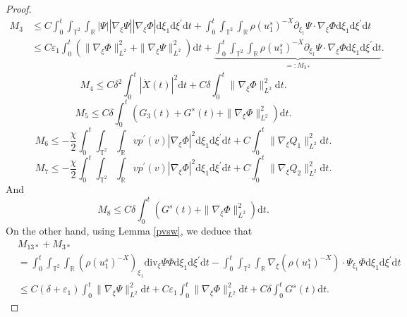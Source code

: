 \documentclass[10pt,reqno]{amsart}
\numberwithin{equation}{section}
\newcommand{\dif}{\mathrm{d}}
\newcommand{\ddiv}{\mathrm{div}}
\begin{document}
\begin{proof}
\begin{equation}
\begin{aligned}
M_3&\le C\int_0^t\int_{\mathbb{T}^2}\int_{\mathbb{R}}
        |\Psi||\nabla_\xi\Psi|
|\nabla_\xi\Phi|\dif \xi_1\dif \xi^{\prime}\dif t
+\int_0^t\int_{\mathbb{T}^2}\int_{\mathbb{R}}
        \rho (u_1^s)^{-X}\partial_{\xi_1}\Psi
\cdot\nabla_\xi\Phi\dif \xi_1\dif \xi^{\prime}\dif t\\
&\le C\varepsilon_1\int_0^t\left(\|\nabla_\xi\Phi\|_{L^2}^2+\|\nabla_\xi\Psi\|_{L^2}^2\right)\dif t
+\underbrace{\int_0^t\int_{\mathbb{T}^2}\int_{\mathbb{R}}
        \rho (u_1^s)^{-X}\partial_{\xi_1}\Psi
\cdot\nabla_\xi\Phi\dif \xi_1\dif \xi^{\prime}\dif t}\limits_{=:M_{3\ast}}.
\end{aligned}
\end{equation}
\begin{equation}\label{m4}
M_4 \le C\delta^2\int_0^t|\dot X(t)|^2\dif t+C\delta\int_0^t\|\nabla_\xi\Phi\|_{L^2}^2\dif t.
\end{equation}
\begin{equation}\label{m5}
M_5 \le C\delta\int_0^t\left(G_3(t)+G^s(t)+\|\nabla_\xi\Phi\|_{L^2}^2\right)\dif t.
\end{equation}
\begin{equation}\label{m6}
M_6 \le -\frac{\chi}{2}\int_0^t\int_{\mathbb{T}^2}\int_{\mathbb{R}}vp^\prime(v)|\nabla_\xi\Phi|^2\dif \xi_1\dif \xi^{\prime}\dif t+C\int_0^t\|\nabla_\xi Q_1\|_{L^2}^2\dif t.
\end{equation}
\begin{equation}\label{m7}
M_7 \le -\frac{\chi}{2}\int_0^t\int_{\mathbb{T}^2}\int_{\mathbb{R}}vp^\prime(v)|\nabla_\xi\Phi|^2\dif \xi_1\dif \xi^{\prime}\dif t+C\int_0^t\|\nabla_\xi Q_2\|_{L^2}^2\dif t.
\end{equation}
And
\begin{equation}\label{m8}
M_8 \le C\delta\int_0^t\left(G^s(t)+\|\nabla_\xi\Phi\|_{L^2}^2\right)\dif t.
\end{equation}
On the other hand, using Lemma \ref{pvsw}, we deduce that
\begin{equation}\label{m9}
\begin{aligned}
&M_{13\ast}+M_{3\ast}\\
&=\int_0^t\int_{\mathbb{T}^2}\int_{\mathbb{R}}
\left(\rho(u_1^s)^{-X}\right)_{\xi_1}\ddiv_\xi\Psi\Phi\dif \xi_1\dif \xi^{\prime}\dif t
-\int_0^t\int_{\mathbb{T}^2}\int_{\mathbb{R}}
\nabla_\xi\left(\rho(u_1^s)^{-X}\right)\cdot\Psi_{\xi_1}\Phi\dif \xi_1\dif \xi^{\prime}\dif t\\
&\le C(\delta
+\varepsilon_1)\int_0^t\|\nabla_\xi\Psi\|_{L^2}^2\dif t
+C\varepsilon_1\int_0^t\|\nabla_\xi\Phi\|_{L^2}^2\dif t
+C\delta\int_0^tG^s(t)\dif t.
\end{aligned}
\end{equation}


\end{proof}
\end{document}

